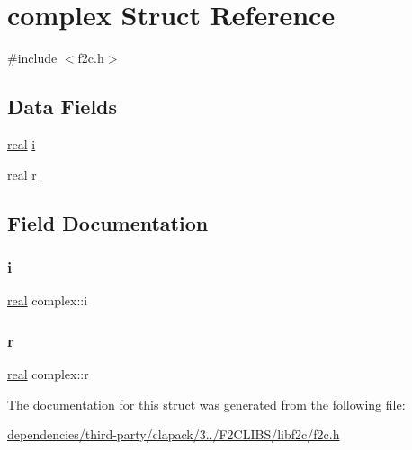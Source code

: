 \hypertarget{structcomplex}{}\section{complex Struct Reference}
\label{structcomplex}


{\ttfamily \#include $<$f2c.\+h$>$}

\subsection*{Data Fields}
\begin{DoxyCompactItemize}
\item 
\hyperlink{dependencies_2third-party_2clapack_23_82_81_2_f2_c_l_i_b_s_2libf2c_2f2c_8h_a031f8951175b43076c2084a6c2173410}{real} \hyperlink{structcomplex_aa55283d87e8d89c794bac746fb11d524}{i}
\item 
\hyperlink{dependencies_2third-party_2clapack_23_82_81_2_f2_c_l_i_b_s_2libf2c_2f2c_8h_a031f8951175b43076c2084a6c2173410}{real} \hyperlink{structcomplex_a03cba9844d71e49f4ddf7c5f3dd45822}{r}
\end{DoxyCompactItemize}


\subsection{Field Documentation}
\mbox{\label{structcomplex_aa55283d87e8d89c794bac746fb11d524}} 
\subsubsection{\texorpdfstring{i}{i}}
{\footnotesize\ttfamily \hyperlink{dependencies_2third-party_2clapack_23_82_81_2_f2_c_l_i_b_s_2libf2c_2f2c_8h_a031f8951175b43076c2084a6c2173410}{real} complex\+::i}

\mbox{\label{structcomplex_a03cba9844d71e49f4ddf7c5f3dd45822}} 
\subsubsection{\texorpdfstring{r}{r}}
{\footnotesize\ttfamily \hyperlink{dependencies_2third-party_2clapack_23_82_81_2_f2_c_l_i_b_s_2libf2c_2f2c_8h_a031f8951175b43076c2084a6c2173410}{real} complex\+::r}



The documentation for this struct was generated from the following file\+:\begin{DoxyCompactItemize}
\item 
\hyperlink{dependencies_2third-party_2clapack_23_82_81_2_f2_c_l_i_b_s_2libf2c_2f2c_8h}{dependencies/third-\/party/clapack/3../\+F2\+C\+L\+I\+B\+S/libf2c/f2c.\+h}\end{DoxyCompactItemize}
